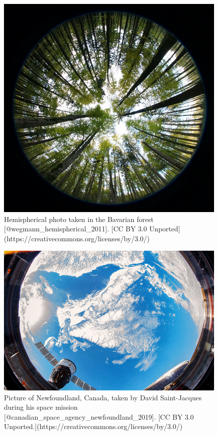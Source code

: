 \documentclass[
]{book}
\begin{document}
\begin{figure}
\includegraphics[width=0.9\linewidth]{images/12-hemispherical-lens} \caption{Hemispherical photo taken in the Bavarian forest [@wegmann_hemispherical_2011]. [CC BY 3.0 Unported](https://creativecommons.org/licenses/by/3.0/)}\label{fig:12-hemispherical-lens}
\end{figure}

\begin{figure}
\includegraphics[width=0.9\linewidth]{images/12-newfoundland_from_space} \caption{Picture of Newfoundland, Canada, taken by David Saint-Jacques during his space mission [@canadian_space_agency_newfoundland_2019]. [CC BY 3.0 Unported.](https://creativecommons.org/licenses/by/3.0/)}\label{fig:12-newfoundland-from-space}
\end{figure}
\end{document}
